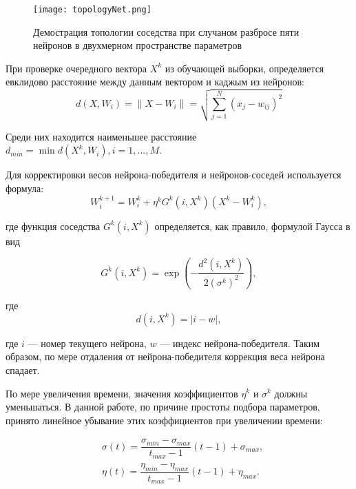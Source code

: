 \begin{figure}[H]
\centering
\texttt{[image: topologyNet.png]}
\caption{Демострация топологии соседства при случаном разбросе пяти нейронов в двухмерном пространстве параметров}
\label{img:somNetr}
\end{figure}

При проверке очередного вектора $X^k$ из обучающей выборки, определяется евклидово расстояние между данным вектором и каджым из  нейронов:
\begin{equation}
    d \left( X , W _ { i } \right) = \left\| X - W _ { i } \right\| = \sqrt { \sum _ { j = 1 } ^ { N } \left( x _ { j } - w _ { i j } \right) ^ { 2 } }
\end{equation}

Среди них находится наименьшее расстояние $d_{min} = \min d \left( X^k , W _ { i } \right), i = 1, ..., M$. 

Для корректировки весов нейрона-победителя и нейронов-соседей используется формула:
\begin{equation}
W _ { i } ^ { k + 1 } = W _ { i } ^ { k } + \eta ^ { k } G ^ { k } \left( i , X ^ { k } \right) \left( X ^ { k } - W _ { i } ^ { k } \right),
\end{equation}

где функция соседства $G ^ { k } \left( i , X ^ { k } \right)$ определяется, как правило, формулой Гаусса в вид

\begin{equation}
G ^ { k } \left( i , X ^ { k } \right) = \exp \left( - \frac { d ^ { 2 } \left( i , X ^ { k } \right) } { 2 \left( \sigma ^ { k } \right) ^ { 2 } } \right),
\end{equation}

где 
\begin{equation}
	d(i, X^k) = \left| i - w \right|,
\end{equation}

где $i$ --- номер текущего нейрона, $w$ --- индекс нейрона-победителя. Таким образом, по мере отдаления от нейрона-победителя коррекция веса нейрона спадает.

По мере увеличения времени, значения коэффициентов $\eta ^ { k }$ и $\sigma ^ { k }$ должны уменьшаться. В данной работе, по причине простоты подбора параметров, принято линейное убывание этих коэффициентов при увеличении времени:

\begin{equation}\label{eq:linearDecay}
		\begin{aligned}
		&	\sigma (t) = \dfrac{\sigma_{min} - \sigma_{max}}{t_{max} - 1}(t - 1) + \sigma_{max},\\
		&   \eta (t) = \dfrac{\eta_{min} - \eta_{max}}{t_{max} - 1}(t - 1) + \eta_{max}.
		\end{aligned}  		
\end{equation}

